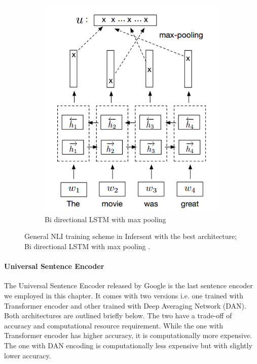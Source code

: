 \begin{figure}
\begin{subfigure}[b]{.5\textwidth}
		\includegraphics[width=\textwidth]{figures/semantic_textual_similarity/sentence_encoders/infersent.png}
		\caption{Bi directional LSTM  with max pooling}
		\label{fig:infersent_architecture}
	\end{subfigure}
	\caption[Infersent Architecture]{General NLI training scheme in Infersent with the best architecture; Bi directional LSTM  with max pooling \cite{conneau-EtAl:2017:EMNLP2017}. }
	\label{fig:infersent}
\end{figure}

\paragraph{Universal Sentence Encoder}

The Universal Sentence Encoder \cite{cer2018universal} released by Google is the last sentence encoder we employed in this chapter. It comes with two versions i.e. one trained with Transformer encoder and other trained with Deep Averaging Network
(DAN). Both architectures are outlined briefly below. The two have a trade-off of accuracy and computational resource requirement. While the one with Transformer encoder has higher accuracy, it is computationally more expensive. The one with DAN encoding is computationally less expensive but with slightly lower accuracy.

